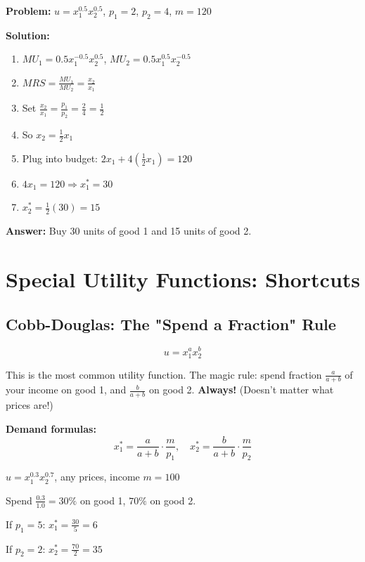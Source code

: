 \documentclass[11pt]{article}
\begin{document}
\begin{example}
\textbf{Problem:} $u = x_1^{0.5} x_2^{0.5}$, $p_1 = 2$, $p_2 = 4$, $m = 120$

\textbf{Solution:}
\begin{enumerate}
    \item $MU_1 = 0.5 x_1^{-0.5} x_2^{0.5}$, $MU_2 = 0.5 x_1^{0.5} x_2^{-0.5}$
    \item $MRS = \frac{MU_1}{MU_2} = \frac{x_2}{x_1}$
    \item Set $\frac{x_2}{x_1} = \frac{p_1}{p_2} = \frac{2}{4} = \frac{1}{2}$
    \item So $x_2 = \frac{1}{2}x_1$
    \item Plug into budget: $2x_1 + 4(\frac{1}{2}x_1) = 120$
    \item $4x_1 = 120 \Rightarrow x_1^* = 30$
    \item $x_2^* = \frac{1}{2}(30) = 15$
\end{enumerate}
\textbf{Answer:} Buy 30 units of good 1 and 15 units of good 2.
\end{example}

\section{Special Utility Functions: Shortcuts}

\subsection{Cobb-Douglas: The "Spend a Fraction" Rule}

$$u = x_1^a x_2^b$$

\begin{intuition}
This is the most common utility function. The magic rule: spend fraction $\frac{a}{a+b}$ of your income on good 1, and $\frac{b}{a+b}$ on good 2. \textbf{Always!} (Doesn't matter what prices are!)
\end{intuition}

\textbf{Demand formulas:}
$$x_1^* = \frac{a}{a+b} \cdot \frac{m}{p_1}, \quad x_2^* = \frac{b}{a+b} \cdot \frac{m}{p_2}$$

\begin{example}
$u = x_1^{0.3} x_2^{0.7}$, any prices, income $m = 100$

Spend $\frac{0.3}{1.0} = 30\%$ on good 1, $70\%$ on good 2.

If $p_1 = 5$: $x_1^* = \frac{30}{5} = 6$

If $p_2 = 2$: $x_2^* = \frac{70}{2} = 35$
\end{example}
\end{document}
